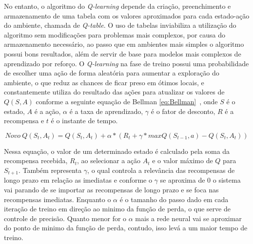 No entanto, o algoritmo do \emph{Q-learning} depende da criação, preenchimento e armazenamento de uma tabela com os valores aproximados para cada estado-ação do ambiente, chamada de \emph{Q-table}. O uso de tabelas inviabiliza a utilização do algoritmo sem modificações para problemas mais complexos, por causa do armazenamento necessário, ao passo que em ambientes mais simples o algoritmo possui bons resultados, além de servir de base para modelos mais complexos de aprendizado por reforço. O \emph{Q-learning} na fase de treino possui uma probabilidade de escolher uma ação de forma aleatória para aumentar a exploração do ambiente, o que reduz as chances de ficar preso em ótimos locais, e constantemente utiliza do resultado das ações para atualizar os valores de $Q(S, A)$ conforme a seguinte equação de Bellman \ref{eq:Bellman}~\citep{Bellman_1954}, onde $S$ é o estado, $A$ é a ação, $\alpha$ é a taxa de aprendizado, $\gamma$ é o fator de desconto, $R$ é a recompensa e $t$ é o instante de tempo.

\begin{equation}
	\label{eq:Bellman}
	Novo \ Q(S_{t}, A_{t}) = Q(S_{t}, A_{t}) + \alpha * (R_{t} + \gamma * maxQ(S_{t-1}, a) - Q(S_{t}, A_{t}))
\end{equation}

Nessa equação, o valor de um determinado estado é calculado pela soma da recompensa recebida, $R_{t}$, ao selecionar a ação $A_{t}$ e o valor máximo de $Q$ para $S_{t+1}$. Também representa $\gamma$, o qual controla a relevância das recompensas de longo prazo em relação as imediatas e conforme o $\gamma$ se aproxima de $0$ o sistema vai parando de se importar as recompensas de longo prazo e se foca nas recompensas imediatas. Enquanto o $\alpha$ é o tamanho do passo dado em cada iteração de treino em direção ao minimo da função de perda, o que serve de controle de precisão. Quanto menor for o $\alpha$ mais a rede neural vai se aproximar do ponto de minimo da função de perda, contudo, isso levá a um maior tempo de treino.
